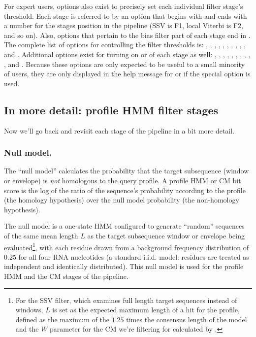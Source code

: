 For expert users, options also exist to precisely set each individual
filter stage's threshold. Each stage is referred to by an option that
begins with  and ends with a number for the stages position
in the pipeline (SSV is F1, local Viterbi is F2, and so on). Also,
options that pertain to the bias filter part of each stage end in
. The complete list of options for controlling the filter
thresholds is: , , ,
, , , ,
, , , and
. Additional options exist for turning on or of each stage
as well: , , ,
, , , ,
, , , and .
Because these options are only expected to be useful to a small
minority of users, they are only displayed in the help message for
 or  if the special 
option is used.

\subsection{In more detail: profile HMM filter stages}

Now we'll go back and revisit each stage of the pipeline in a bit more detail.

\subsubsection{Null model.}

The ``null model'' calculates the probability that the target
subsequence (window or envelope) is \emph{not} homologous to the query
profile. A profile HMM or CM bit score is the log of the ratio of the
sequence's probability according to the profile (the homology
hypothesis) over the null model probability (the non-homology
hypothesis).

The null model is a one-state HMM configured to generate ``random''
sequences of the same mean length $L$ as the target subsequence window
or envelope being evaluated\footnote{For the SSV filter, which
examines full length target sequences instead of windows, $L$ is set
as the expected maximum length of a hit for the profile, defined as
the maximum of the $1.25$ times the consensus length of the model and
the $W$ parameter for the CM we're filtering for calculated by
.}, with each residue drawn from a background
frequency distribution of $0.25$ for all four RNA nucleotides (a
standard i.i.d. model: residues are treated as independent and
identically distributed). This null model is used for the profile HMM
and the CM stages of the pipeline. 

